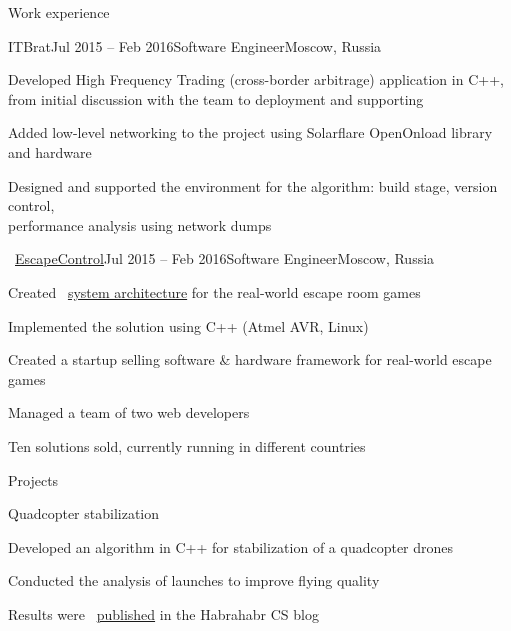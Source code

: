 \documentclass{resume} %
\begin{document}
\begin{rSection}{Work experience}
\begin{rSubsection}{ITBrat}{Jul 2015 -- Feb 2016}{Software Engineer}{Moscow, Russia}
	\item Developed High Frequency Trading (cross-border arbitrage) application in C++, from initial discussion with the team to deployment and supporting
	\item Added low-level networking to the project using Solarflare OpenOnload library and hardware
	\item Designed and supported the environment for the algorithm: build stage, version control,\\ performance analysis using network dumps
\end{rSubsection}
	
\begin{rSubsection}{\faExternalLink~\href{http://escapecontrol.ru}{EscapeControl}}{Jul 2015 -- Feb 2016}{Software Engineer}{Moscow, Russia}
	\item Created \faExternalLink~\href{http://habr.ru/p/258585/}{system architecture} for the real-world escape room games
	\item Implemented the solution using C++ (Atmel AVR, Linux)
	\item Created a startup selling software \& hardware framework for real-world escape games
	\item Managed a team of two web developers
	\item Ten solutions sold, currently running in different countries
\end{rSubsection}
		
\end{rSection}

\begin{rSection}{Projects}
\begin{rSubsection}{Quadcopter stabilization}{}{}{}
\item Developed an algorithm in C++ for stabilization of a quadcopter drones
\item Conducted the analysis of launches to improve flying quality
\item Results were \faExternalLink~\href{http://habr.ru/p/216437}{published} in the Habrahabr CS blog
\end{rSubsection}
\end{rSection}
\end{document}
